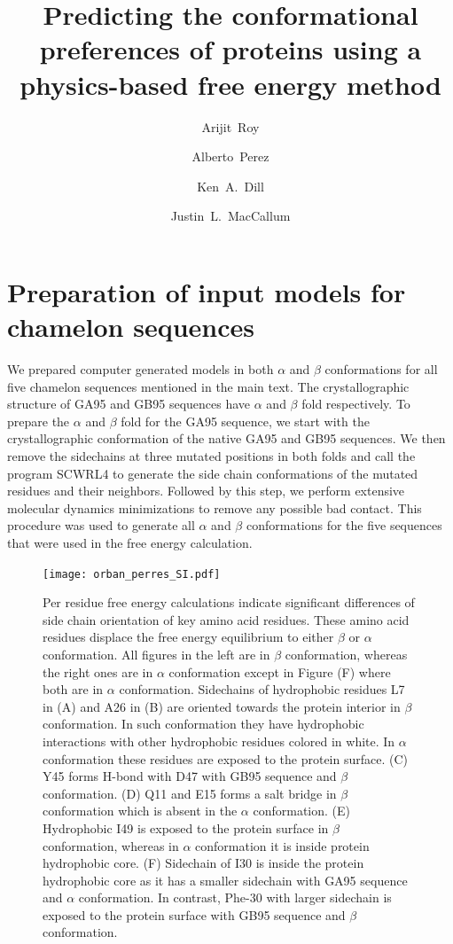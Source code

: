 \documentclass[12pt]{article}
\author{Arijit~Roy}
\author{Alberto~Perez}
\author{Ken~A.~Dill}
\author{Justin~L.~MacCallum}
\affil{Laufer Center for Physical and Quantitative Biology\\
    and Departments of Physics and Chemistry\\
    Stony Brook University\\
    Stony Brook, NY 11794-5252.}
\title{Predicting the conformational preferences of proteins using a physics-based free energy
method}
\begin{document}
\maketitle


\section*{Preparation of input models for chamelon sequences}

We prepared computer generated models in both $\alpha$ and $\beta$ conformations for all five chamelon sequences mentioned 
in the main text. The crystallographic structure of GA95 and GB95 sequences have $\alpha$ and $\beta$ fold respectively.
To prepare the $\alpha$ and $\beta$ fold for the GA95 sequence, we start with the crystallographic
conformation of the native GA95 and GB95 sequences. 
We then remove the sidechains at three mutated positions in both folds
and call the program SCWRL4 \cite{Krivov2009} to generate the side chain conformations of the
mutated residues and their neighbors. Followed by 
this step, we perform extensive molecular dynamics
minimizations to remove any possible bad contact. This procedure was used to generate all $\alpha$ and 
$\beta$ conformations for the five sequences that were used in the free energy calculation.   

\setcounter{figure}{0}
\makeatletter 
\renewcommand{\thefigure}{S\@arabic\c@figure}
\begin{figure}
\texttt{[image: orban\_perres\_SI.pdf]}
\label{fig:orban_full}
\caption{Per residue free energy calculations indicate significant differences of side chain orientation of key amino acid residues. These amino acid
residues displace the free energy equilibrium to either $\beta$ or
$\alpha$ conformation. All figures in the left are in $\beta$ conformation, whereas the right ones are in $\alpha$ conformation except in Figure (F) 
where both are in $\alpha$ conformation.
Sidechains of hydrophobic residues L7 in (A) and A26 in (B) are oriented towards the protein interior in $\beta$ 
conformation. In such conformation they have hydrophobic interactions with other hydrophobic residues colored in white. In $\alpha$ conformation these residues are 
exposed to the protein surface.  
(C) Y45 forms H-bond with D47 with GB95 sequence and $\beta$ conformation. (D) Q11 and E15 forms a salt bridge in $\beta$ conformation which is absent
in the $\alpha$ conformation. (E) Hydrophobic I49 is exposed to the protein surface in $\beta$ conformation, whereas in $\alpha$ conformation it 
is inside protein hydrophobic core. (F) Sidechain of I30 is inside the protein hydrophobic core as it has a smaller sidechain with GA95 sequence 
and $\alpha$ conformation. In contrast, Phe-30 with larger sidechain is exposed to the protein surface with GB95 sequence and $\beta$ conformation.}
\end{figure}
\end{document}
